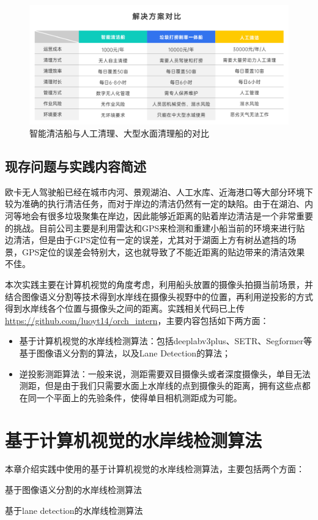 \documentclass[cn,12pt,color=mine,scheme=chinese,bibstyle=gb7714-2015]{elegantbook}
\begin{document}
\begin{figure}[h]
	\centering
	\includegraphics[width=.9\linewidth]{images/bg4}
	\caption{\label{bg4}智能清洁船与人工清理、大型水面清理船的对比}
\end{figure}

\section{现存问题与实践内容简述}
欧卡无人驾驶船已经在城市内河、景观湖泊、人工水库、近海港口等大部分环境下较为准确的执行清洁任务，而对于岸边的清洁仍然有一定的缺陷。由于在湖泊、内河等地会有很多垃圾聚集在岸边，因此能够近距离的贴着岸边清洁是一个非常重要的挑战。目前公司主要是利用雷达和GPS来检测和重建小船当前的环境来进行贴边清洁，但是由于GPS定位有一定的误差，尤其对于湖面上方有树丛遮挡的场景，GPS定位的误差会特别大，这也就导致了不能近距离的贴边带来的清洁效果不佳。

本次实践主要在计算机视觉的角度考虑，利用船头放置的摄像头拍摄当前场景，并结合图像语义分割等技术得到水岸线在摄像头视野中的位置，再利用逆投影的方式得到水岸线各个位置与摄像头之间的距离。实践相关代码已上传\url{https://github.com/luoyt14/orch_intern}，主要内容包括如下两方面：
\begin{itemize}
	\item 基于计算机视觉的水岸线检测算法：包括deeplabv3plus\cite{chen2018encoderdecoder}、SETR\cite{zheng2021rethinking}、Segformer\cite{xie2021segformer}等基于图像语义分割的算法，以及Lane Detection\cite{qin2020ultra}的算法；
	\item 逆投影测距算法：一般来说，测距需要双目摄像头或者深度摄像头，单目无法测距，但是由于我们只需要水面上水岸线的点到摄像头的距离，拥有这些点都在同一个平面上的先验条件，使得单目相机测距成为可能。
\end{itemize}


\chapter{基于计算机视觉的水岸线检测算法}
本章介绍实践中使用的基于计算机视觉的水岸线检测算法，主要包括两个方面：
\begin{introduction}
	\item 基于图像语义分割的水岸线检测算法
	\item 基于lane detection的水岸线检测算法
\end{introduction}
\end{document}
